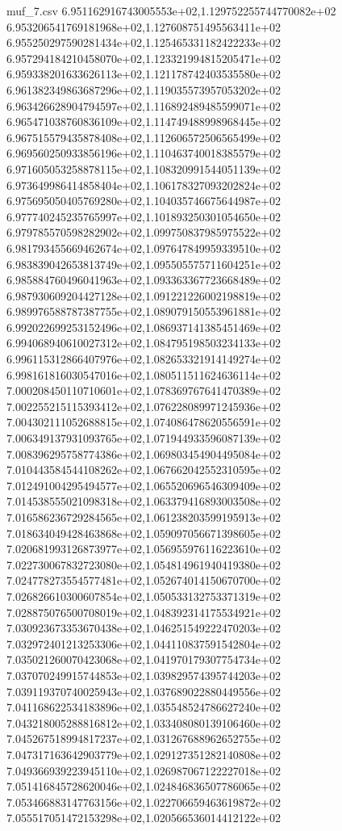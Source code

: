 \begin{filecontents*}{muf_7.csv}
6.951162916743005553e+02,1.129752255744770082e+02
6.953206541769181968e+02,1.127608751495563411e+02
6.955250297590281434e+02,1.125465331182422233e+02
6.957294184210458070e+02,1.123321994815205471e+02
6.959338201633626113e+02,1.121178742403535580e+02
6.961382349863687296e+02,1.119035573957053202e+02
6.963426628904794597e+02,1.116892489485599071e+02
6.965471038760836109e+02,1.114749488998968445e+02
6.967515579435878408e+02,1.112606572506565499e+02
6.969560250933856196e+02,1.110463740018385579e+02
6.971605053258878115e+02,1.108320991544051139e+02
6.973649986414858404e+02,1.106178327093202824e+02
6.975695050405769280e+02,1.104035746675644987e+02
6.977740245235765997e+02,1.101893250301054650e+02
6.979785570598282902e+02,1.099750837985975522e+02
6.981793455669462674e+02,1.097647849959339510e+02
6.983839042653813749e+02,1.095505575711604251e+02
6.985884760496041963e+02,1.093363367723668489e+02
6.987930609204427128e+02,1.091221226002198819e+02
6.989976588787387755e+02,1.089079150553961881e+02
6.992022699253152496e+02,1.086937141385451469e+02
6.994068940610027312e+02,1.084795198503234133e+02
6.996115312866407976e+02,1.082653321914149274e+02
6.998161816030547016e+02,1.080511511624636114e+02
7.000208450110710601e+02,1.078369767641470389e+02
7.002255215115393412e+02,1.076228089971245936e+02
7.004302111052688815e+02,1.074086478620556591e+02
7.006349137931093765e+02,1.071944933596087139e+02
7.008396295758774386e+02,1.069803454904495084e+02
7.010443584544108262e+02,1.067662042552310595e+02
7.012491004295494577e+02,1.065520696546309409e+02
7.014538555021098318e+02,1.063379416893003508e+02
7.016586236729284565e+02,1.061238203599195913e+02
7.018634049428463868e+02,1.059097056671398605e+02
7.020681993126873977e+02,1.056955976116223610e+02
7.022730067832723080e+02,1.054814961940419380e+02
7.024778273554577481e+02,1.052674014150670700e+02
7.026826610300607854e+02,1.050533132753371319e+02
7.028875076500708019e+02,1.048392314175534921e+02
7.030923673353670438e+02,1.046251549222470203e+02
7.032972401213253306e+02,1.044110837591542804e+02
7.035021260070423068e+02,1.041970179307754734e+02
7.037070249915744853e+02,1.039829574395744203e+02
7.039119370740025943e+02,1.037689022880449556e+02
7.041168622534183896e+02,1.035548524786627240e+02
7.043218005288816812e+02,1.033408080139106460e+02
7.045267518994817237e+02,1.031267688962652755e+02
7.047317163642903779e+02,1.029127351282140808e+02
7.049366939223945110e+02,1.026987067122227018e+02
7.051416845728620046e+02,1.024846836507786065e+02
7.053466883147763156e+02,1.022706659463619872e+02
7.055517051472153298e+02,1.020566536014412122e+02

\end{filecontents*}
